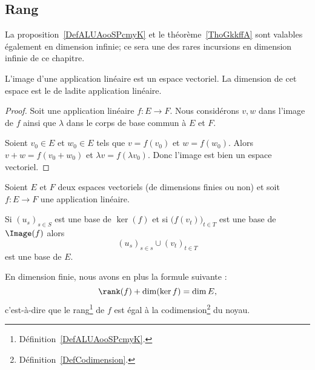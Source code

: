 \subsection{Rang}

La proposition~\ref{DefALUAooSPcmyK} et le théorème~\ref{ThoGkkffA} sont valables également en dimension infinie; ce sera une des rares incursions en dimension infinie de ce chapitre.
\begin{propositionDef}\label{DefALUAooSPcmyK}
	L'image d'une application linéaire est un espace vectoriel. La dimension de cet espace est le  de ladite application linéaire.
\end{propositionDef}

\begin{proof}
	Soit une application linéaire \( f\colon E\to F\). Nous considérons \( v,w\) dans l'image de \( f\) ainsi que \( \lambda\) dans le corps de base commun à \( E\) et \( F\).

	Soient \( v_0\in E\) et \( w_0\in E\) tels que \( v=f(v_0)\) et \( w=f(w_0)\). Alors \( v+w=f(v_0+w_0)\) et \( \lambda v=f(\lambda v_0)\). Donc l'image est bien un espace vectoriel.
\end{proof}

\begin{theorem}       \label{ThoGkkffA}
	Soient \( E\) et \( F\) deux espaces vectoriels (de dimensions finies ou non) et soit \( f\colon E\to F\) une application linéaire.

	Si \( (u_s)_{s\in S}\) est une base de \( \ker(f)\) et si \( \big( f(v_t) \big)_{t\in T}\) est une base de \( \Image(f)\) alors
	\begin{equation}
		(u_s)_{s\in s}\cup (v_t)_{t\in T}
	\end{equation}
	est une base de \( E\).

	En dimension finie, nous avons en plus la formule suivante :
	\begin{equation}     \label{EQooUEOQooLySRiE}
		\rank(f)+\dim(\ker f)=\dim E,
	\end{equation}
	c'est-à-dire que le rang\footnote{Définition~\ref{DefALUAooSPcmyK}.} de \( f\) est égal à la codimension\footnote{Définition~\ref{DefCodimension}.} du noyau.
\end{theorem}

